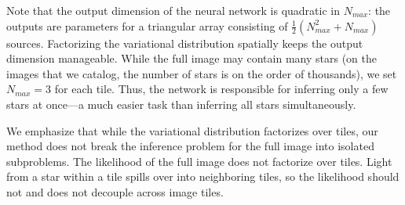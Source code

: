 Note that the output dimension of the neural network is quadratic in $N_{max}$: the outputs are parameters for a triangular array consisting of $\frac{1}{2}(N_{max}^2 + N_{max})$ sources.
Factorizing the variational distribution spatially keeps the output dimension manageable.
While the full image may contain many stars
(on the images that we catalog, the number of stars is on the order of thousands),
we set $N_{max} = 3$ for each tile.
Thus, the network is responsible for inferring only a few stars at once---a much easier task than inferring all stars simultaneously.

We emphasize that while the variational distribution factorizes over tiles, our method does not break the inference problem for the full image into isolated subproblems.
The likelihood of the full image does not factorize over tiles. Light from a star within a tile spills over into neighboring tiles, so the likelihood should not and does not decouple across image tiles.
